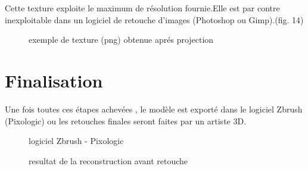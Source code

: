 \documentclass[a4paper,10pt,french]{sphinxhowto}
\begin{document}
Cette texture exploite le maximum de résolution fournie.Elle est par contre inexploitable dans un logiciel de retouche d'images (Photoshop ou Gimp).(fig. 14)
\begin{figure}[htbp]
\centering
\capstart

\caption{exemple de texture (png) obtenue aprés projection}\end{figure}


\section{Finalisation}
\label{finalisation:finalisation}\label{finalisation::doc}
Une fois toutes ces étapes achevées , le modèle est exporté dans le logiciel Zbrush (Pixologic) ou les retouches finales seront faites par un artiste 3D.
\begin{figure}[htbp]
\centering
\capstart

\caption{resultat de la reconstruction avant retouche}{\small 
logiciel Zbrush - Pixologic
}\end{figure}
\end{document}
